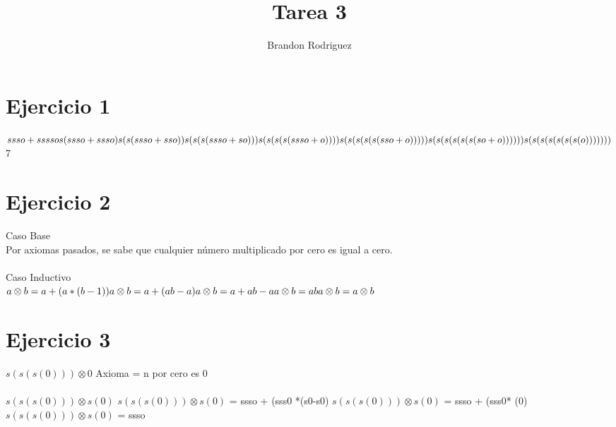 \documentclass[14pt]{article}
\author{Brandon Rodriguez}
\title{Tarea 3}
\begin{document}
\maketitle
\section{Ejercicio 1}
$ssso + sssso \newline
s(ssso + ssso) \newline
s(s(ssso + sso)) \newline
s(s(s(ssso + so))) \newline
s(s(s(s(ssso+o)))) \newline
s(s(s(s(s(sso+o))))) \newline
s(s(s(s(s(s(so+o)))))) \newline 
s(s(s(s(s(s(s(o))))))) \newline$
7

\section{Ejercicio 2}
Caso Base
\\
Por axiomas pasados, se sabe que cualquier número multiplicado por cero es igual a cero.
\\
\\
Caso Inductivo\\
$a\otimes b = a + (a*(b-1)) \newline
a\otimes b = a + (ab-a) \newline
a\otimes b = a + ab-a \newline
a\otimes b = ab \newline
a\otimes b = a\otimes b $
\\

\section{Ejercicio 3}
$s(s(s(0))) \otimes 0$ \newline
 \newline
Axioma = n por cero es 0
\\
\\

{$s(s(s(0)))\otimes s(0)$} \newline
{$s(s(s(0)))\otimes s(0)$} = ssso + (sss0 *(s0-s0) \newline
{$s(s(s(0)))\otimes s(0)$} = ssso + (sss0* (0) \newline
{$s(s(s(0)))\otimes s(0)$} = ssso \newline
\\
\\
\\
\end{document}
